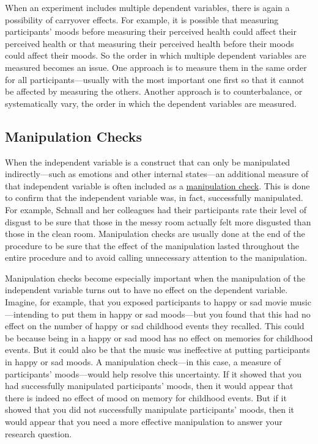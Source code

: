 \documentclass[
]{krantz}
\begin{document}
When an experiment includes multiple dependent variables, there is again a possibility of carryover effects. For example, it is possible that measuring participants' moods before measuring their perceived health could affect their perceived health or that measuring their perceived health before their moods could affect their moods. So the order in which multiple dependent variables are measured becomes an issue. One approach is to measure them in the same order for all participants---usually with the most important one first so that it cannot be affected by measuring the others. Another approach is to counterbalance, or systematically vary, the order in which the dependent variables are measured.

\hypertarget{manipulation-checks}{%
\subsection*{Manipulation Checks}\label{manipulation-checks}}


When the independent variable is a construct that can only be manipulated indirectly---such as emotions and other internal states---an additional measure of that independent variable is often included as a \protect\hyperlink{manipulation-check-1}{manipulation check}. This is done to confirm that the independent variable was, in fact, successfully manipulated. For example, Schnall and her colleagues had their participants rate their level of disgust to be sure that those in the messy room actually felt more disgusted than those in the clean room. Manipulation checks are usually done at the end of the procedure to be sure that the effect of the manipulation lasted throughout the entire procedure and to avoid calling unnecessary attention to the manipulation.

Manipulation checks become especially important when the manipulation of the independent variable turns out to have no effect on the dependent variable. Imagine, for example, that you exposed participants to happy or sad movie music---intending to put them in happy or sad moods---but you found that this had no effect on the number of happy or sad childhood events they recalled. This could be because being in a happy or sad mood has no effect on memories for childhood events. But it could also be that the music was ineffective at putting participants in happy or sad moods. A manipulation check---in this case, a measure of participants' moods---would help resolve this uncertainty. If it showed that you had successfully manipulated participants' moods, then it would appear that there is indeed no effect of mood on memory for childhood events. But if it showed that you did not successfully manipulate participants' moods, then it would appear that you need a more effective manipulation to answer your research question.
\end{document}
